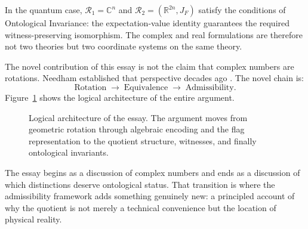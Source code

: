 \documentclass[12pt]{article}
\begin{document}
In the quantum case, $\mathcal{R}_1 = \mathbb{C}^n$ and $\mathcal{R}_2 = (\mathbb{R}^{2n}, J_F)$ satisfy the conditions of Ontological Invariance: the expectation-value identity guarantees the required witness-preserving isomorphism. The complex and real formulations are therefore not two theories but two coordinate systems on the same theory.

The novel contribution of this essay is not the claim that complex numbers are rotations. Needham established that perspective decades ago \cite{Needham}. The novel chain is:
\[
\text{Rotation}
\;\longrightarrow\;
\text{Equivalence}
\;\longrightarrow\;
\text{Admissibility.}
\]
Figure~\ref{fig:architecture} shows the logical architecture of the entire argument.

\begin{figure}[ht]
\centering
{}
\caption{Logical architecture of the essay. The argument moves from geometric
rotation through algebraic encoding and the flag representation to the quotient
structure, witnesses, and finally ontological invariants.}
\label{fig:architecture}
\end{figure}

The essay begins as a discussion of complex numbers and ends as a discussion of which distinctions deserve ontological status. That transition is where the admissibility framework adds something genuinely new: a principled account of why the quotient is not merely a technical convenience but the location of physical reality.
\end{document}
